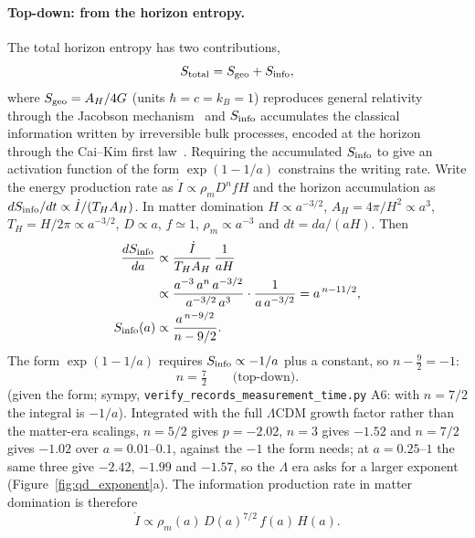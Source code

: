 \paragraph{Top-down: from the horizon entropy.} The total horizon entropy has two contributions,
\begin{equation}
S_{\rm total}=S_{\rm geo}+S_{\rm info},\label{eq:qr_Stot}
\end{equation}
where $S_{\rm geo}=A_H/4G$ (units $\hbar=c=k_B=1$) reproduces general relativity through the Jacobson mechanism~\cite{Jacobson1995} and $S_{\rm info}$
accumulates the classical information written by irreversible bulk processes, encoded at the horizon through the Cai--Kim first law~\cite{CaiKim2005}.
\interp{} Requiring the accumulated $S_{\rm info}$ to give an activation function of the form $\exp(1-1/a)$ constrains the writing rate.
Write the energy production rate as $\dot I\propto\rho_mD^nfH$ and the horizon accumulation as $dS_{\rm info}/dt\propto\dot I/(T_HA_H)$. In matter domination
$H\propto a^{-3/2}$, $A_H=4\pi/H^2\propto a^3$, $T_H=H/2\pi\propto a^{-3/2}$, $D\propto a$, $f\simeq1$, $\rho_m\propto a^{-3}$ and $dt=da/(aH)$. Then
\begin{equation}
\begin{aligned}\frac{dS_{\rm info}}{da}&\propto\frac{\dot I}{T_HA_H}\,\frac{1}{aH}\\&\propto\frac{a^{-3}\,a^n\,a^{-3/2}}{a^{-3/2}\,a^{3}}\cdot\frac{1}{a\,a^{-3/2}}=a^{\,n-11/2},
\\S_{\rm info}(a)&\propto\frac{a^{\,n-9/2}}{n-9/2}.\end{aligned}\label{eq:qr_Sinfo}
\end{equation}
The form $\exp(1-1/a)$ requires $S_{\rm info}\propto-1/a$ plus a constant, so $n-\tfrac92=-1$:
\begin{equation}n=\tfrac72\qquad\text{(top-down).}\label{eq:qr_n72}\end{equation}
\derived{} (given the form; sympy, \texttt{verify\_records\_measurement\_time.py} A6: with $n=7/2$ the integral is $-1/a$). Integrated with the full $\Lambda$CDM growth factor rather than the matter-era scalings,
$n=5/2$ gives $p=-2.02$, $n=3$ gives $-1.52$ and $n=7/2$ gives $-1.02$ over $a=0.01$--$0.1$, against the $-1$ the form needs; at $a=0.25$--$1$ the same
three give $-2.42$, $-1.99$ and $-1.57$, so the $\Lambda$ era asks for a larger exponent (Figure~\ref{fig:qd_exponent}a). \calc{} The information
production rate in matter domination is therefore
\begin{equation}
\dot I\propto\rho_m(a)\,D(a)^{7/2}\,f(a)\,H(a).\label{eq:qr_Idot}
\end{equation}

